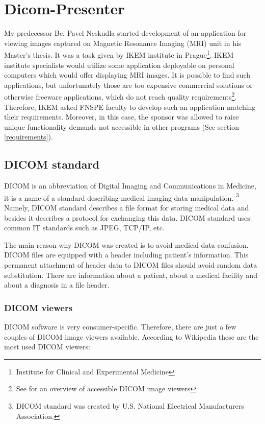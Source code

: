 \chapter{Dicom-Presenter}
\vspace{-10mm}
My predecessor Bc. Pavel Neskudla started development of an application for viewing images captured on Magnetic Resonance Imaging (MRI) unit in his Master's thesis\cite{neskudla}. It was a task given by IKEM institute in Prague\footnote{Institute for Clinical and Experimental Medicine}. IKEM institute specialists would utilize some application deployable on personal computers which would offer displaying MRI images. It is possible to find such applications, but unfortunately those are too expensive commercial solutions or otherwise freeware applications, which do not reach quality requirements\footnote{See \cite[page~9]{flaska_bc} for an overview of accessible DICOM image viewers}. Therefore, IKEM asked FNSPE faculty to develop such an application matching their requirements. Moreover, in this case, the sponsor was allowed to raise unique functionality demands not accessible in other programs (See section \ref{requirements}).

\section{DICOM standard}

DICOM is an abbreviation of Digital Imaging and Communications in Medicine, it is a name of a standard describing medical imaging data manipulation. \footnote{DICOM standard was created by  U.S. National Electrical Manufacturers Association\cite{nema}.} Namely, DICOM standard describes a file format for storing medical data and besides it describes a protocol for exchanging this data. DICOM standard uses common IT standards such as JPEG, TCP/IP, etc.

The main reason why DICOM was created is to avoid medical data confusion. DICOM files are equipped with a header including patient's information. This permanent attachment of header data to DICOM files should avoid random data substitution. There are information about a patient, about a medical facility and about a diagnosis in a file header.

\subsection{DICOM viewers}
\label{viewers}
DICOM software is very consumer-specific. Therefore, there are just a few couples of DICOM image viewers available. According to Wikipedia these are the most used DICOM viewers:

